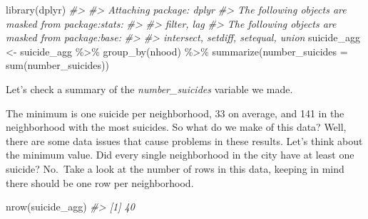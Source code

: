 \documentclass[
]{krantz}
\makeatletter
\newenvironment{Shaded}{\begin{snugshade}}{\end{snugshade}}
\newcommand{\AttributeTok}[1]{\textcolor[rgb]{0.61,0.61,0.61}{#1}}
\newcommand{\CommentTok}[1]{\textcolor[rgb]{0.37,0.37,0.37}{\textit{#1}}}
\newcommand{\FunctionTok}[1]{\textcolor[rgb]{0,0,0}{#1}}
\newcommand{\NormalTok}[1]{#1}
\newcommand{\OtherTok}[1]{\textcolor[rgb]{0.37,0.37,0.37}{#1}}
\newcommand{\SpecialCharTok}[1]{\textcolor[rgb]{0,0,0}{#1}}
\newenvironment{kframe}{%
\medskip{}
\setlength{\fboxsep}{.8em}
 \def\at@end@of@kframe{}%
 \ifinner\ifhmode%
  \def\at@end@of@kframe{\end{minipage}}%
  \begin{minipage}{\columnwidth}%
 \fi\fi%
 \def\FrameCommand##1{\hskip\@totalleftmargin \hskip-\fboxsep
 \colorbox{shadecolor}{##1}\hskip-\fboxsep
     \hskip-\linewidth \hskip-\@totalleftmargin \hskip\columnwidth}%
 \MakeFramed {\advance\hsize-\width
   \@totalleftmargin\z@ \linewidth\hsize
   \@setminipage}}%
 {\par\unskip\endMakeFramed%
 \at@end@of@kframe}
\renewenvironment{Shaded}{\begin{kframe}}{\end{kframe}}
\makeatother
\begin{document}
\begin{Shaded}
\begin{Highlighting}[]
\FunctionTok{library}\NormalTok{(dplyr)}
\CommentTok{\#\textgreater{} }
\CommentTok{\#\textgreater{} Attaching package: \textquotesingle{}dplyr\textquotesingle{}}
\CommentTok{\#\textgreater{} The following objects are masked from \textquotesingle{}package:stats\textquotesingle{}:}
\CommentTok{\#\textgreater{} }
\CommentTok{\#\textgreater{}     filter, lag}
\CommentTok{\#\textgreater{} The following objects are masked from \textquotesingle{}package:base\textquotesingle{}:}
\CommentTok{\#\textgreater{} }
\CommentTok{\#\textgreater{}     intersect, setdiff, setequal, union}
\NormalTok{suicide\_agg }\OtherTok{\textless{}{-}}\NormalTok{ suicide\_agg }\SpecialCharTok{\%\textgreater{}\%} 
  \FunctionTok{group\_by}\NormalTok{(nhood) }\SpecialCharTok{\%\textgreater{}\%} 
  \FunctionTok{summarize}\NormalTok{(}\AttributeTok{number\_suicides =} \FunctionTok{sum}\NormalTok{(number\_suicides))}
\end{Highlighting}
\end{Shaded}

Let's check a summary of the \emph{number\_suicides} variable we made.

\begin{Shaded}
\end{Shaded}

The minimum is one suicide per neighborhood, 33 on average, and 141 in the neighborhood with the most suicides. So what do we make of this data? Well, there are some data issues that cause problems in these results. Let's think about the minimum value. Did every single neighborhood in the city have at least one suicide? No.~Take a look at the number of rows in this data, keeping in mind there should be one row per neighborhood.

\begin{Shaded}
\begin{Highlighting}[]
\FunctionTok{nrow}\NormalTok{(suicide\_agg)}
\CommentTok{\#\textgreater{} [1] 40}
\end{Highlighting}
\end{Shaded}
\end{document}
